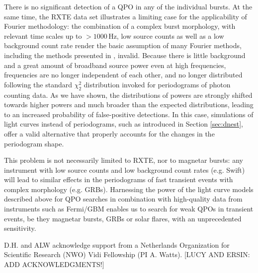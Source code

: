 \documentclass[numberedappendix]{emulateapj}
\newcommand{\hz}{\,\mathrm{Hz}}
\begin{document}
There is no significant detection of a QPO in any of the individual bursts. At the same time, the RXTE data set illustrates a limiting case for the applicability of Fourier methodology: the combination of a complex burst morphology, with relevant time scales up to $>1000 \hz$, low source counts as well as a low background 
count rate render the basic assumption of many Fourier methods, including the methods presented in \citep{huppenkothen2013}, invalid. Because there is little background and a great amount of broadband source power even at high frequencies, frequencies are no longer independent of each other, and no longer distributed following the standard $\chi^2_2$ distribution invoked for periodograms of photon counting data. As we have shown, the distributions of powers are strongly shifted towards higher powers and much broader than the expected distributions, leading to an increased probability of false-positive detections. In this case, simulations of light curves instead of periodograms, such as introduced in Section \ref{sec:dnest}, offer a valid alternative that properly accounts for the changes in the periodogram shape. 

This problem is not necessarily limited to RXTE, nor to magnetar bursts: any instrument with low source counts and low background count rates (e.g. Swift) will lead to similar effects in the periodograms of fast transient events with complex morphology (e.g. GRBs). Harnessing the power of the light curve models described above for QPO searches in combination with high-quality data from instruments such as Fermi/GBM enables us to search for weak QPOs in transient events, be they magnetar bursts, GRBs or solar flares, with an unprecedented sensitivity. 


\acknowledgments
D.H. and ALW acknowledge support from a Netherlands Organization for Scientific Research (NWO) Vidi Fellowship (PI A. Watts).  
[LUCY AND ERSIN: ADD ACKNOWLEDGMENTS!]



\end{document}
